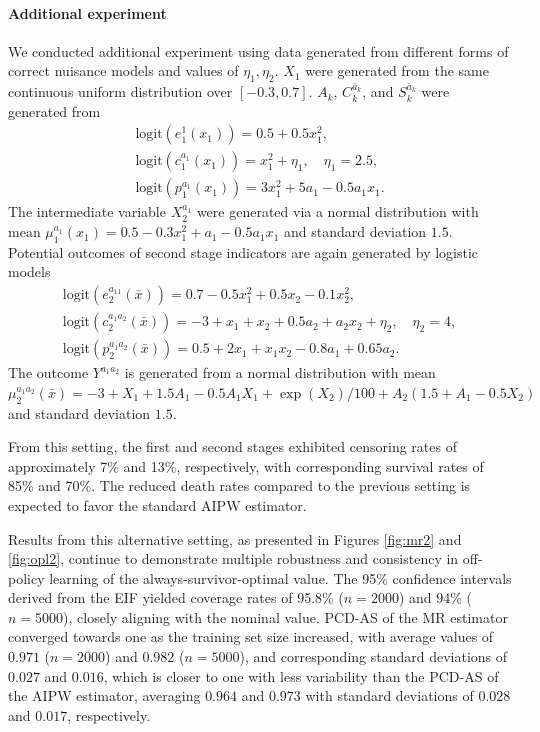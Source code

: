 \documentclass{article}
\begin{document}
\paragraph{Additional experiment}
We conducted additional experiment using data generated from different forms of correct nuisance models and values of $\eta_1,\eta_2$.
$X_1$ were generated from the same continuous uniform distribution over $[-0.3, 0.7]$. $A_k$, $C_k^{\bar{a}_k}$, and $S_k^{\bar{a}_k}$ were generated from
\begin{gather}
	\text{logit}(e_1^1(x_1))=0.5 + 0.5x_1^2, \label{eq:dgp3} \\
	\text{logit}(c_1^{a_1}(x_1))=x_1^2 + \eta_1, \quad \eta_1=2.5, \\
	\text{logit}(p_1^{a_1}(x_1))=3x_1^2 + 5a_1 - 0.5a_1x_1.
\end{gather}
The intermediate variable $X_2^{a_1}$ were generated via a normal distribution with mean $\mu_1^{a_1}(x_1) = 0.5 - 0.3x_{1}^2 + a_1 - 0.5a_1x_{1}$ and standard deviation $1.5$. 
Potential outcomes of second stage indicators are again generated by logistic models
\begin{gather}
	\text{logit}(e_2^{a_11}(\bar x))=0.7 - 0.5x_{1}^2 + 0.5x_{2} -0.1 x_2^2, \\
	\text{logit}(c_2^{a_1a_2}(\bar x))=-3 + x_1 + x_2 + 0.5 a_2 + a_2x_2 + \eta_2, \quad \eta_2=4, \\
	\text{logit}(p_2^{a_1a_2}(\bar x))=0.5 + 2 x_1 + x_1x_2 -0.8 a_1 + 0.65 a_2. \label{eq:dgp4}
\end{gather}
The outcome $Y^{a_1a_2}$ is generated from a normal distribution with mean $\mu_2^{a_1a_2}(\bar{x}) = -3 + X_1 + 1.5A_1 -0.5 A_1X_1 + \exp(X_2)/100 + A_2(1.5 + A_1 -0.5 X_2)$ and standard deviation $1.5$.

From this setting, the first and second stages exhibited censoring rates of approximately 7\% and 13\%, respectively, with corresponding survival rates of 85\% and 70\%.
The reduced death rates compared to the previous setting is expected to favor the standard AIPW estimator.

Results from this alternative setting, as presented in Figures \ref{fig:mr2} and \ref{fig:opl2}, continue to demonstrate multiple robustness and consistency in off-policy learning of the always-survivor-optimal value.
The 95\% confidence intervals derived from the EIF yielded coverage rates of 95.8\% ($n = 2000$) and 94\% ($n = 5000$), closely aligning with the nominal value.
PCD-AS of the MR estimator converged towards one as the training set size increased, with average values of $0.971$ ($n = 2000$) and $0.982$ ($n = 5000$), and corresponding standard deviations of $0.027$ and $0.016$, {which is closer to one with less variability than the PCD-AS of the AIPW estimator, averaging $0.964$ and $0.973$ with standard deviations of $0.028$ and $0.017$, respectively.}
\end{document}
